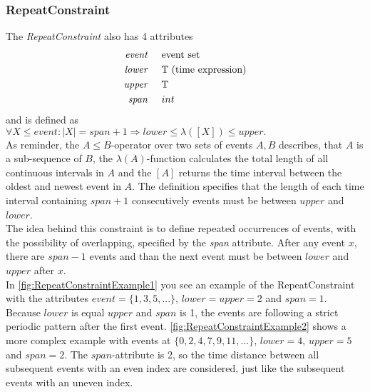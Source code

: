 	\subsubsection{RepeatConstraint}
		The \emph{RepeatConstraint} also has 4 attributes
		\begin{align*}
			\emph{event} & \hspace{.5cm}\text{event set}\\
			\emph{lower} & \hspace{.5cm}\text{$\mathbb{T}$ (time expression)}\\
			\emph{upper} & \hspace{.5cm}\text{$\mathbb{T}$}\\
			\emph{span}	 & \hspace{.5cm}\text{$int$}\\
		\end{align*}
		and is defined as\\[10pt]
		\begin{math}
			\forall X\leq event: |X|=span+1\Rightarrow lower \leq \lambda([X])\leq upper.
		\end{math}\\[10pt]
		As reminder, the $A\leq B$-operator over two sets of events $A, B$ describes, that $A$ is a sub-sequence of $B$, the $\lambda(A)$-function calculates the total length of all continuous intervals in $A$ and the $[A]$ returns the time interval between the oldest and newest event in $A$.
		The definition specifies that the length of each time interval containing $span+1$ consecutively events must be between $upper$ and $lower$.\\
		The idea behind this constraint is to define repeated occurrences of events, with the possibility of overlapping, specified by the \emph{span} attribute. After any event $x$, there are $span-1$ events and than the next event must be between $lower$ and $upper$ after $x$.\\
		In \ref{fig:RepeatConstraintExample1} you see an example of the RepeatConstraint with the attributes $event=\{1,3,5,...\}$, $lower=upper=2$ and $span=1$. Because $lower$ is equal $upper$ and $span$ is 1, the events are following a strict periodic pattern after the first event. \ref{fig:RepeatConstraintExample2} shows a more complex example with events at $\{0, 2, 4, 7, 9, 11,...\}$, $lower=4$, $upper=5$ and $span=2$. The $span$-attribute is 2, so the time distance between all subsequent events with an even index are considered, just like the subsequent events with an uneven index. 
		
